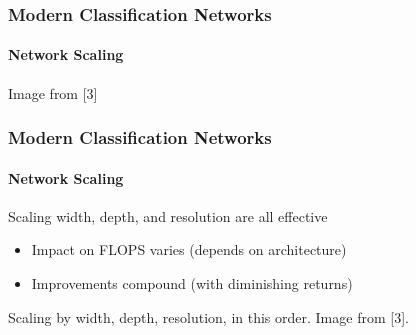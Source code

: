 \documentclass[xetex,professionalfont]{beamer}
\begin{document}
\begin{frame}
	\frametitle{Modern Classification Networks}
	\framesubtitle{Network Scaling}

	\begin{center}
		{\centering Image from [3]}
	\end{center}

\end{frame}


\begin{frame}
	\frametitle{Modern Classification Networks}
	\framesubtitle{Network Scaling}

	Scaling width, depth, and resolution are all effective
	\begin{itemize}
		\item Impact on FLOPS varies (depends on architecture)
		\item Improvements compound (with diminishing returns)
	\end{itemize}

	\bigskip

	\begin{center}
		{\centering Scaling by width, depth, resolution, in this order. Image from [3].}
	\end{center}

\end{frame}
\end{document}
